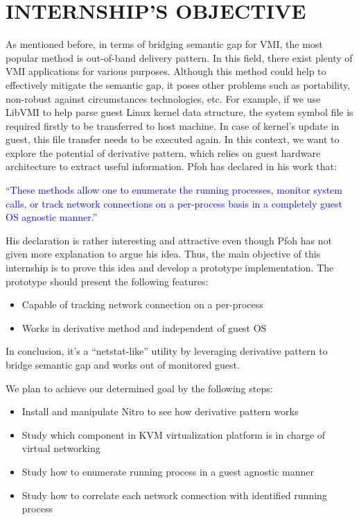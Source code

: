 
\chapter{INTERNSHIP’S OBJECTIVE} %

\label{Chapter3} %


As mentioned before, in terms of bridging semantic gap for VMI, the most popular method is out-of-band delivery pattern. In this field, there exist plenty of VMI applications for various purposes. Although this method could help to effectively mitigate the semantic gap, it poses other problems such as portability, non-robust against circumstances technologies, etc. For example, if we use LibVMI to help parse guest Linux kernel data structure, the system symbol file is required firstly to be transferred to host machine. In case of kernel’s update in guest, this file transfer needs to be executed again. In this context, we want to explore the potential of derivative pattern, which relies on guest hardware architecture to extract useful information. Pfoh has declared in his work \citep{Reference7} that:

\textcolor{blue}{“These methods allow one to enumerate the running processes, monitor system calls, or track network connections on a per-process basis in a completely guest OS agnostic manner.” }

His declaration is rather interesting and attractive even though Pfoh has not given more explanation to argue his idea. Thus, the main objective of this internship is to prove this idea and develop a prototype implementation. The prototype should present the following features:

\begin{itemize}
    \item Capable of tracking network connection on a per-process
    \item Works in derivative method and independent of guest OS
 \end{itemize}

In conclusion, it’s a “netstat-like” utility by leveraging derivative pattern to bridge semantic gap and works out of monitored guest.

We plan to achieve our determined goal by the following steps:

\begin{itemize}
    \item Install and manipulate Nitro to see how derivative pattern works
    \item Study which component in KVM virtualization platform is in charge of virtual networking
    \item Study how to enumerate running process in a guest agnostic manner
    \item Study how to correlate each network connection with identified running process 
 \end{itemize}
